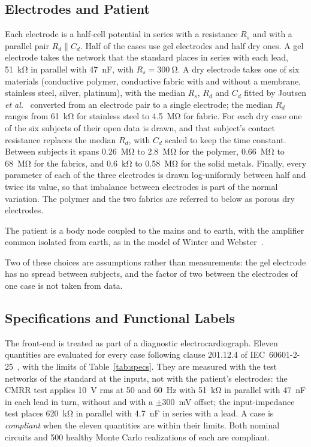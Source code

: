 \subsection{Electrodes and Patient}
\label{sec:electrodes}

Each electrode is a half-cell potential in series with a resistance $R_s$ and with a parallel
pair $R_d \parallel C_d$. Half of the cases use gel electrodes and half dry ones. A gel electrode
takes the network that the standard places in series with each lead, \SI{51}{\kilo\ohm} in
parallel with \SI{47}{\nano\farad}, with $R_s=\SI{300}{\ohm}$. A dry electrode takes one of six
materials (conductive polymer, conductive fabric with and without a membrane, stainless steel,
silver, platinum), with the median $R_s$, $R_d$ and $C_d$ fitted by Joutsen \emph{et
al.}~\cite{joutsen2024} converted from an electrode pair to a single electrode; the median $R_d$
ranges from \SI{61}{\kilo\ohm} for stainless steel to \SI{4.5}{\mega\ohm} for fabric. For each
dry case one of the six subjects of their open data is drawn, and that subject's contact
resistance replaces the median $R_d$, with $C_d$ scaled to keep the time constant. Between
subjects it spans \SI{0.26}{\mega\ohm} to \SI{2.8}{\mega\ohm} for the polymer, \SI{0.66}{\mega\ohm}
to \SI{68}{\mega\ohm} for the fabrics, and \SI{0.6}{\kilo\ohm} to \SI{0.58}{\mega\ohm} for the
solid metals. Finally, every parameter of each of the three electrodes is drawn log-uniformly
between half and twice its value, so that imbalance between electrodes is part of the normal
variation. The polymer and the two fabrics are referred to below as porous dry electrodes.

The patient is a body node coupled to the mains and to earth, with the amplifier common isolated
from earth, as in the model of Winter and Webster~\cite{winter1983}.

Two of these choices are assumptions rather than measurements: the gel electrode has no spread
between subjects, and the factor of two between the electrodes of one case is not taken from
data.

\subsection{Specifications and Functional Labels}
\label{sec:specs}

The front-end is treated as part of a diagnostic electrocardiograph. Eleven quantities are
evaluated for every case following clause 201.12.4 of IEC~60601-2-25~\cite{iec60601225}, with the
limits of Table~\ref{tab:specs}. They are measured with the test networks of the standard at the
inputs, not with the patient's electrodes: the CMRR test applies \SI{10}{\volt} rms at 50 and
\SI{60}{\hertz} with \SI{51}{\kilo\ohm} in parallel with \SI{47}{\nano\farad} in each lead in
turn, without and with a $\pm$\SI{300}{\milli\volt} offset; the input-impedance test places
\SI{620}{\kilo\ohm} in parallel with \SI{4.7}{\nano\farad} in series with a lead. A case is
\emph{compliant} when the eleven quantities are within their limits. Both nominal circuits and
500 healthy Monte Carlo realizations of each are compliant.

